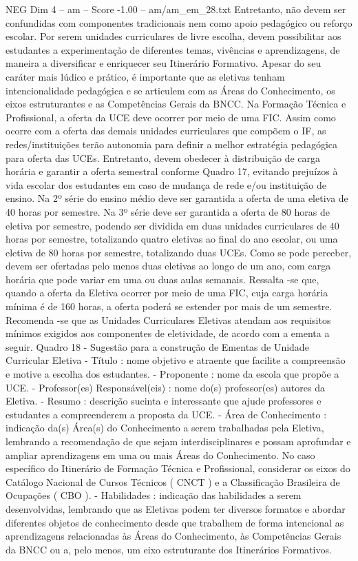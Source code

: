 \begin{textsample}{NEG Dim 4 – am – Score -1.00 – am/am\_em\_28.txt}
Entretanto, não devem ser confundidas com componentes tradicionais nem como apoio pedagógico ou reforço escolar.
Por serem unidades curriculares de livre escolha, devem possibilitar aos estudantes a experimentação de diferentes temas, vivências e aprendizagens, de maneira a diversificar e enriquecer seu Itinerário Formativo.
Apesar do seu caráter mais lúdico e prático, é importante que as eletivas tenham intencionalidade pedagógica e se articulem com as Áreas do Conhecimento, os eixos estruturantes e as Competências Gerais da BNCC.
Na Formação Técnica e Profissional, a oferta da UCE deve ocorrer por meio de uma FIC.
Assim como ocorre com a oferta das demais unidades curriculares que compõem o IF, as redes/instituições terão autonomia para definir a melhor estratégia pedagógica para oferta das UCEs.
Entretanto, devem obedecer à distribuição de carga horária e garantir a oferta semestral conforme Quadro 17, evitando prejuízos à vida escolar dos estudantes em caso de mudança de rede e/ou instituição de ensino.
Na 2º série do ensino médio deve ser garantida a oferta de uma eletiva de 40 horas por semestre.
Na 3º série deve ser garantida a oferta de 80 horas de eletiva por semestre, podendo ser dividida em duas unidades curriculares de 40 horas por semestre, totalizando quatro eletivas ao final do ano escolar, ou uma eletiva de 80 horas por semestre, totalizando duas UCEs.
Como se pode perceber, devem ser ofertadas pelo menos duas eletivas ao longo de um ano, com carga horária que pode variar em uma ou duas aulas semanais.
Ressalta -se que, quando a oferta da Eletiva ocorrer por meio de uma FIC, cuja carga horária mínima é de 160 horas, a oferta poderá se estender por mais de um semestre.
Recomenda -se que as Unidades Curriculares Eletivas atendam aos requisitos mínimos exigidos aos componentes de eletividade, de acordo com a ementa a seguir.
Quadro 18 - Sugestão para a construção de Ementas de Unidade Curricular Eletiva - Título : nome objetivo e atraente que facilite a compreensão e motive a escolha dos estudantes. - Proponente : nome da escola que propõe a UCE. - Professor(es) Responsável(eis) : nome do(s) professor(es) autores da Eletiva. - Resumo : descrição sucinta e interessante que ajude professores e estudantes a compreenderem a proposta da UCE. - Área de Conhecimento : indicação da(s) Área(s) do Conhecimento a serem trabalhadas pela Eletiva, lembrando a recomendação de que sejam interdisciplinares e possam aprofundar e ampliar aprendizagens em uma ou mais Áreas do Conhecimento.
No caso específico do Itinerário de Formação Técnica e Profissional, considerar os eixos do Catálogo Nacional de Cursos Técnicos ( CNCT ) e a Classificação Brasileira de Ocupações ( CBO ). - Habilidades : indicação das habilidades a serem desenvolvidas, lembrando que as Eletivas podem ter diversos formatos e abordar diferentes objetos de conhecimento desde que trabalhem de forma intencional as aprendizagens relacionadas às Áreas do Conhecimento, às Competências Gerais da BNCC ou a, pelo menos, um eixo estruturante dos Itinerários Formativos.

\end{textsample}
